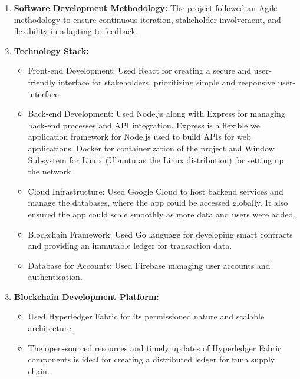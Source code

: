\begin{enumerate}
	\item \textbf{Software Development Methodology:} The project followed an Agile methodology to ensure continuous iteration, stakeholder involvement, and flexibility in adapting to feedback.
	\item \textbf{Technology Stack:} 
		\begin{itemize}
			\item Front-end Development: Used React for creating a secure and user-friendly interface for stakeholders, prioritizing simple and responsive user-interface.
			\item Back-end Development: Used Node.js along with Express for managing back-end processes and API integration. Express is a flexible we application framework for Node.js used to build APIs for web applications. Docker for containerization of the project and Window Subsystem for Linux (Ubuntu as the Linux distribution) for setting up the network.
			\item Cloud Infrastructure: Used Google Cloud to host backend services and manage the databases, where the app could be accessed globally. It also ensured the app could scale smoothly as more data and users were added.  
			\item Blockchain Framework: Used Go language for developing smart contracts and providing an immutable ledger for transaction data.
			\item Database for Accounts: Used Firebase managing user accounts and authentication.
		\end{itemize}
	\item \textbf{Blockchain Development Platform:} 
		\begin{itemize}
			\item Used Hyperledger Fabric for its permissioned nature and scalable architecture.
			\item The open-sourced resources and timely updates of Hyperledger Fabric components is ideal for creating a distributed ledger for tuna supply chain.
		\end{itemize}
\end{enumerate}

